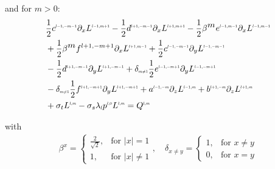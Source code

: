 and for $m>0$:
\begin{align}
&
\frac{1}{2}c^{\scaleto{l-1,-m-1}{4pt}}\partial_x L^{\scaleto{l-1,m+1}{4pt}}
-\frac{1}{2}d^{\scaleto{l+1,-m-1}{4pt}}\partial_x L^{\scaleto{l+1,m+1}{4pt}}
-\frac{1}{2}\beta^{\scaleto{m}{4pt}}e^{\scaleto{l-1,m-1}{4pt}}\partial_x L^{\scaleto{l-1,m-1}{4pt}}
\nonumber
\\&
+\frac{1}{2}\beta^{\scaleto{m}{4pt}}f^{l+1,-m+1}\partial_x L^{\scaleto{l+1,m-1}{4pt}}
+\frac{1}{2}c^{\scaleto{l-1,-m-1}{4pt}}\partial_y L^{\scaleto{l-1,-m-1}{4pt}}
\nonumber
\\&
-\frac{1}{2}d^{\scaleto{l+1,-m-1}{4pt}}\partial_y L^{\scaleto{l+1,-m-1}{4pt}}
+\delta_{\scaleto{m\neq 1}{4pt}}\frac{1}{2}e^{\scaleto{l-1,-m+1}{4pt}}\partial_y L^{\scaleto{l-1,-m+1}{4pt}}
\nonumber
\\&
-\delta_{\scaleto{m\neq 1}{4pt}}\frac{1}{2}f^{\scaleto{l+1,-m+1}{4pt}}\partial_y L^{\scaleto{l+1,-m+1}{4pt}}
+a^{\scaleto{l-1,-m}{4pt}}\partial_z L^{\scaleto{l-1,m}{4pt}}
+b^{\scaleto{l+1,-m}{4pt}}\partial_z L^{\scaleto{l+1,m}{4pt}}
\nonumber
\\&
+\sigma_t L^{\scaleto{l,m}{4pt}}
-\sigma_s\lambda_{\scaleto{l}{4pt}}p^{\scaleto{l,0}{4pt}}L^{\scaleto{l,m}{4pt}}
= Q^{\scaleto{l,m}{4pt}}
\label{eq:rpn_m_>_z}
\end{align}

with
\begin{align*}
\label{eq:real_sh_basis}
\beta^{x}=
\left\{
\begin{array}{lr}
\frac{2}{\sqrt{2}}, & \text{for } \vert x\vert = 1\\
1, & \text{for } \vert x\vert \neq 1
\end{array}
\right.
,\quad
\delta_{x\neq y}=
\left\{
\begin{array}{lr}
1, & \text{for } x \neq y \\
0, & \text{for } x = y
\end{array}
\right.
\end{align*}

